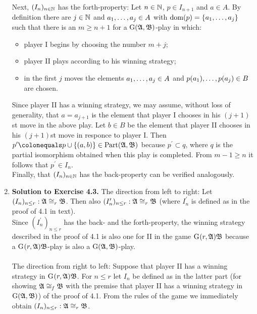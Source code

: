 \begin{enumerate}[1.]
Next, $(I_n)_{n \in \nat}$ has the forth-property: Let $n \in \nat$, $p \in I_{n + 1}$ and $a \in A$. By definition there are $j \in \nat$ and $\seq[1]{a}{j} \in A$ with $\dom{p} = \{ \seq[1]{a}{j} \}$ such that there is an $m \geq n + 1$ for a $\egame{\struct{A}}{\struct{B}}$-play in which:
\begin{itemize}
\item player I begins by choosing the number $m + j$;
%
\item player II plays according to his winning strategy;
%
\item in the first $j$ moves the elements $\seq[1]{a}{j} \in A$ and $\seqp{p(a_1)}{p(a_j)} \in B$ are chosen.
\end{itemize}
Since player II has a winning strategy, we may assume, without loss of generality, that $a = a_{j + 1}$ is the element that player I chooses in his $(j + 1)$st move in the above play. Let $b \in B$ be the element that player II chooses in his $(j + 1)$st move in responce to player I. Then $p^\prime \colonequals p \cup \{ (a, b) \} \in \partism{\struct{A}}{\struct{B}}$ because $p^\prime \subset q$, where $q$ is the partial isomorphism obtained when this play is completed. From $m - 1 \geq n$ it follows that $p^\prime \in I_n$.\medskip\\
Finally, that $(I_n)_{n \in \nat}$ has the back-property can be verified analogously.
%
\item \textbf{Solution to Exercise 4.3.} The direction from left to right: Let $(I_n)_{n \leq r}: \struct{A} \iso_r \struct{B}$. Then also $(I_n^\prime)_{n \leq r}: \struct{A} \iso_r \struct{B}$ (where $I_n^\prime$ is defined as in the proof of 4.1 in text).\medskip\\
Since $(I_n^\prime)_{n \leq r}$ has the back- and the forth-property, the winning strategy described in the proof of 4.1 is also one for II in the game $\egamep{r}{\struct{A}}{\struct{B}}$ because a $\egamep{r}{\struct{A}}{\struct{B}}$-play is also a $\egame{\struct{A}}{\struct{B}}$-play.\\
\ \\
The direction from right to left: Suppose that player II has a winning strategy in $\egamep{r}{\struct{A}}{\struct{B}}$. For $n \leq r$ let $I_n$ be defined as in the latter part (for showing $\struct{A} \finiso \struct{B}$ with the premise that player II has a winning strategy in $\egame{\struct{A}}{\struct{B}}$) of the proof of 4.1. From the rules of the game we immediately obtain $(I_n)_{n \leq r}: \struct{A} \iso_r \struct{B}$.
\end{enumerate}
